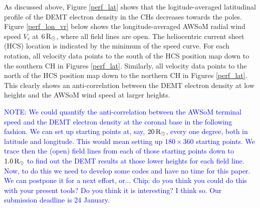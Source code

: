 \documentclass[namedreferences]{solarphysics}
\newcommand{\mrsun}{{\rm R_\odot}}
\def\notebyalbert#1{\textcolor{blue}{NOTE: #1}}
\begin{document}
\begin{article}
{As discussed above, Figure \ref{perf_lat} shows that the logitude-averaged latitudinal profile of the DEMT electron density in the CHs decreases towards the poles. Figure \ref{perf_lon_vr} below shows the longitude-averaged AWSoM radial wind speed $V_r$ at $6\,\mrsun$, where all field lines are open. The heliocentric current sheet (HCS) location is indicated by the minimum of the speed curve. For each rotation, all velocity data points to the south of the HCS position map down to the southern CH in Figures \ref{perf_lat}. Similarly, all velocity data points to the north of the HCS position map down to the northern CH in Figures \ref{perf_lat}. This clearly shows an anti-correlation between the DEMT electron density at low heights and the AWSoM wind speed at larger heights.}

\notebyalbert{We could quantify the anti-correlation between the AWSoM terminal speed and the DEMT electron density at the coronal base in the following fashion. We can set up starting points at, say, $20\,\mrsun$, every one degree, both in latitude and longitude. This would mean setting up $180\times 360$ starting points. We trace then the (open) field lines from each of those starting points down to $1.0\,\mrsun$ to find out the DEMT results at those lower heights for each field line. Now, to do this we need to develop some codes and have no time for this paper. We can postpone it for a next effort, or... Chip: do you think you could do this with your present tools? Do you think it is interesting? I think so. Our submission deadline is 24 January.}


\end{article}
\end{document}
